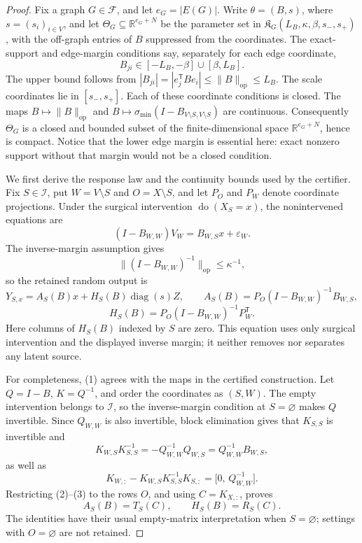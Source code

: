 \documentclass{article}
\begin{document}
\begin{proof}
Fix a graph \(G\in\mathcal F\), and let \(e_G=|E(G)|\).  Write
\(\theta=(B,s)\), where \(s=(s_i)_{i\in V}\), and let
\(\Theta_G\subseteq\mathbb R^{e_G+N}\) be the parameter set in
\(\mathfrak K_G(L_B,\kappa,\beta,s_-,s_+)\), with the off-graph entries of
\(B\) suppressed from the coordinates.  The exact-support and edge-margin
conditions say, separately for each edge coordinate,
\[
 B_{ji}\in[-L_B,-\beta]\cup[\beta,L_B].
\]
The upper bound follows from
\(|B_{ji}|=|e_j^{\mathsf T}Be_i|\leq\lVert B\rVert_{\mathrm{op}}\leq L_B\).
The scale coordinates lie in \([s_-,s_+]\).  Each of these coordinate
conditions is closed.  The maps \(B\mapsto\lVert B\rVert_{\mathrm{op}}\)
and
\(B\mapsto\sigma_{\min}(I-B_{V\setminus S,V\setminus S})\) are continuous.
Consequently \(\Theta_G\) is a closed and bounded subset of the
finite-dimensional space \(\mathbb R^{e_G+N}\), hence is compact.  Notice
that the lower edge margin is essential here: exact nonzero support without
that margin would not be a closed condition.

We first derive the response law and the continuity bounds used by the
certifier.  Fix \(S\in\mathcal I\), put \(W=V\setminus S\) and
\(O=X\setminus S\), and let \(P_O\) and \(P_W\) denote coordinate
projections.  Under the surgical intervention \(\operatorname{do}(X_S=x)\),
the nonintervened equations are
\[
 (I-B_{W,W})V_W=B_{W,S}x+\varepsilon_W.
\]
The inverse-margin assumption gives
\[
 \bigl\|(I-B_{W,W})^{-1}\bigr\|_{\mathrm{op}}
 \leq \kappa^{-1},
\]
so the retained random output is
\[
 Y_{S,x}=A_S(B)x+H_S(B)\operatorname{diag}(s)Z,
 \qquad
 A_S(B)=P_O(I-B_{W,W})^{-1}B_{W,S},
\]
\[
 H_S(B)=P_O(I-B_{W,W})^{-1}P_W^{\mathsf T}.
 \tag{1}
\]
Here columns of \(H_S(B)\) indexed by \(S\) are zero.  This equation uses
only surgical intervention and the displayed inverse margin; it neither
removes nor separates any latent source.

For completeness, (1) agrees with the maps in the certified construction.
Let \(Q=I-B\), \(K=Q^{-1}\), and order the coordinates as \((S,W)\).
The empty intervention belongs to \(\mathcal I\), so the inverse-margin
condition at \(S=\varnothing\) makes \(Q\) invertible.  Since \(Q_{W,W}\)
is also invertible, block elimination gives that \(K_{S,S}\) is invertible
and
\[
 K_{W,S}K_{S,S}^{-1}
   =-Q_{W,W}^{-1}Q_{W,S}
   =Q_{W,W}^{-1}B_{W,S},
 \tag{2}
\]
as well as
\[
 K_{W,:}-K_{W,S}K_{S,S}^{-1}K_{S,:}
   =\bigl[0,\,Q_{W,W}^{-1}\bigr].
 \tag{3}
\]
Restricting (2)--(3) to the rows \(O\), and using
\(C=K_{X,:}\), proves
\[
 A_S(B)=T_S(C),\qquad H_S(B)=R_S(C).
 \tag{4}
\]
The identities have their usual empty-matrix interpretation when
\(S=\varnothing\); settings with \(O=\varnothing\) are not retained.


\end{proof}
\end{document}
